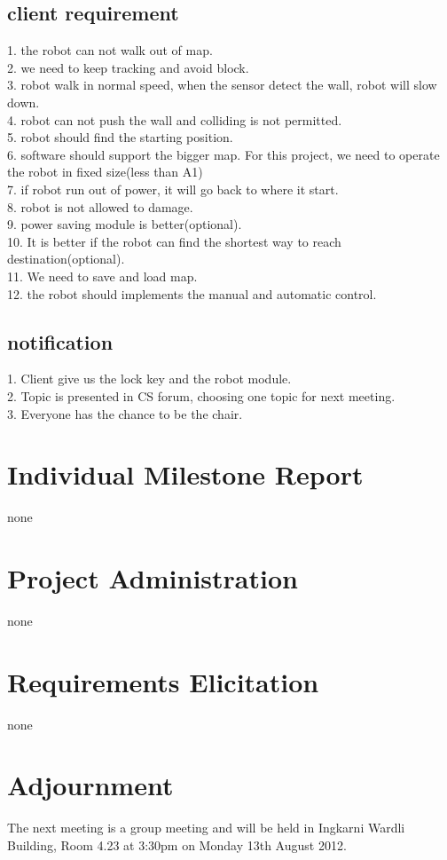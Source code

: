 \documentclass[11pt, a4paper]{article}
\begin{document}
\subsection{client requirement}
1. the robot can not walk out of map.\\
2. we need to keep tracking and avoid block.\\
3. robot walk in normal speed, when the sensor detect the wall, robot will slow down.\\
4. robot can not push the wall and colliding is not permitted. \\
5. robot should find the starting position. \\
6. software should support the bigger map. For this project, we need to operate the robot in fixed size(less than A1)\\
7. if robot run out of power, it will go back to where it start.\\
8. robot is not allowed to damage.\\
9. power saving module is better(optional).\\
10. It is better if the robot can find the shortest way to reach destination(optional).\\
11. We need to save and load map. \\
12. the robot should implements the manual and automatic control.

\subsection{notification}
1. Client give us the lock key and the robot module.\\ 
2. Topic is presented in CS forum, choosing one topic for next meeting.\\
3. Everyone has the chance to be the chair.\\

\section{Individual Milestone Report}
none


\section{Project Administration}
none


\section{Requirements Elicitation}
none

\section{Adjournment}
The next meeting is a group meeting and will be held in Ingkarni Wardli Building, Room 4.23 at 3:30pm on Monday 13th August 2012.

\vspace*{10pt}
\end{document}
